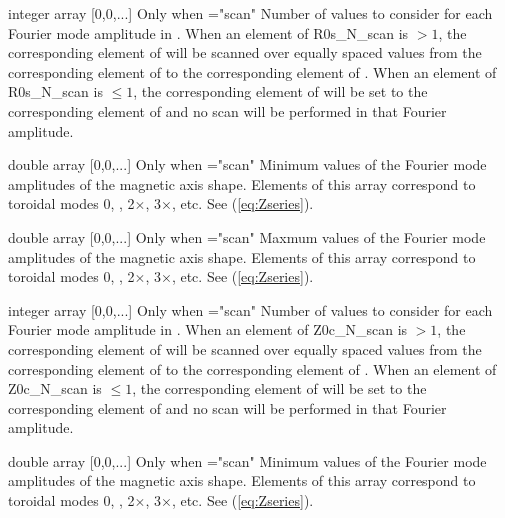 \myhrule

{integer array}
{[0,0,...]}
{Only when ={\ttfamily "scan"}}
{Number of values to consider for each Fourier mode amplitude in . When an element of {\ttfamily R0s\_N\_scan} is $>1$, the corresponding element of  will be scanned over equally spaced values from the corresponding element of  to the corresponding element of .  When an element of {\ttfamily R0s\_N\_scan} is $\le 1$, the corresponding element of  will be set to the corresponding element of  and no scan will be performed in that Fourier amplitude.
}

\myhrule

{double array}
{[0,0,...]}
{Only when ={\ttfamily "scan"}}
{Minimum values of the Fourier mode amplitudes of the magnetic axis shape. Elements of this array correspond to toroidal modes 0, , 2$\times$, 3$\times$, etc.  See (\ref{eq:Zseries}).
}

\myhrule

{double array}
{[0,0,...]}
{Only when ={\ttfamily "scan"}}
{Maxmum values of the Fourier mode amplitudes of the magnetic axis shape. Elements of this array correspond to toroidal modes 0, , 2$\times$, 3$\times$, etc.  See (\ref{eq:Zseries}).
}

\myhrule

{integer array}
{[0,0,...]}
{Only when ={\ttfamily "scan"}}
{Number of values to consider for each Fourier mode amplitude in . When an element of {\ttfamily Z0c\_N\_scan} is $>1$, the corresponding element of  will be scanned over equally spaced values from the corresponding element of  to the corresponding element of .  When an element of {\ttfamily Z0c\_N\_scan} is $\le 1$, the corresponding element of  will be set to the corresponding element of  and no scan will be performed in that Fourier amplitude.
}

\myhrule

{double array}
{[0,0,...]}
{Only when ={\ttfamily "scan"}}
{Minimum values of the Fourier mode amplitudes of the magnetic axis shape. Elements of this array correspond to toroidal modes 0, , 2$\times$, 3$\times$, etc.  See (\ref{eq:Zseries}).
}

